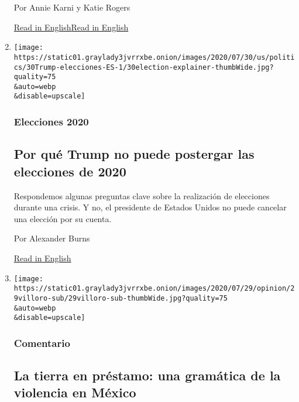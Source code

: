 \begin{enumerate}
  Por Annie Karni y Katie Rogers

  \href{https://www.nytimes3xbfgragh.onion/2020/07/28/us/politics/donald-fred-trump.html}{Read
  in
  English}\href{https://www.nytimes3xbfgragh.onion/2020/07/28/us/politics/donald-fred-trump.html}{Read
  in English}
\item
  \href{/es/2020/07/30/espanol/estados-unidos/trump-retrasar-elecciones.html}{}

  \texttt{[image: https://static01.graylady3jvrrxbe.onion/images/2020/07/30/us/politics/30Trump-elecciones-ES-1/30election-explainer-thumbWide.jpg?quality=75\\\&auto=webp\\\&disable=upscale]}

  \hypertarget{elecciones-2020}{%
  \subsubsection{Elecciones 2020}\label{elecciones-2020}}

  \hypertarget{por-quuxe9-trump-no-puede-postergar-las-elecciones-de-2020}{%
  \subsection{Por qué Trump no puede postergar las elecciones de
  2020}\label{por-quuxe9-trump-no-puede-postergar-las-elecciones-de-2020}}

  Respondemos algunas preguntas clave sobre la realización de elecciones
  durante una crisis. Y no, el presidente de Estados Unidos no puede
  cancelar una elección por su cuenta.

  Por Alexander Burns

  \href{https://www.nytimes3xbfgragh.onion/2020/07/30/us/politics/trump-postpone-election.html}{Read
  in English}
\item
  \href{/es/2020/07/30/espanol/opinion/aztecas-violencia-narco-amlo.html}{}

  \texttt{[image: https://static01.graylady3jvrrxbe.onion/images/2020/07/29/opinion/29villoro-sub/29villoro-sub-thumbWide.jpg?quality=75\\\&auto=webp\\\&disable=upscale]}

  \hypertarget{comentario-2}{%
  \subsubsection{Comentario}\label{comentario-2}}

  \hypertarget{la-tierra-en-pruxe9stamo-una-gramuxe1tica-de-la-violencia-en-muxe9xico-1}{%
  \subsection{La tierra en préstamo: una gramática de la violencia en
  México}\label{la-tierra-en-pruxe9stamo-una-gramuxe1tica-de-la-violencia-en-muxe9xico-1}}


\end{enumerate}
